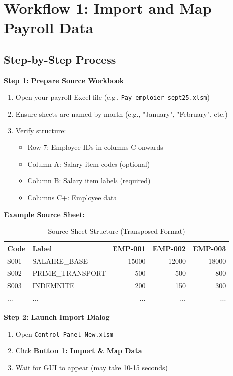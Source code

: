 \section{Workflow 1: Import and Map Payroll Data}

\subsection{Step-by-Step Process}

\textbf{Step 1: Prepare Source Workbook}

\begin{enumerate}
    \item Open your payroll Excel file (e.g., \texttt{Pay\_emploier\_sept25.xlsm})
    \item Ensure sheets are named by month (e.g., "January", "February", etc.)
    \item Verify structure:
    \begin{itemize}
        \item Row 7: Employee IDs in columns C onwards
        \item Column A: Salary item codes (optional)
        \item Column B: Salary item labels (required)
        \item Columns C+: Employee data
    \end{itemize}
\end{enumerate}

\textbf{Example Source Sheet:}

\begin{table}[H]
\centering
\footnotesize
\begin{tabular}{|l|l|r|r|r|}
\hline
\textbf{Code} & \textbf{Label} & \textbf{EMP-001} & \textbf{EMP-002} & \textbf{EMP-003} \\
\hline
S001 & SALAIRE\_BASE & 15000 & 12000 & 18000 \\
S002 & PRIME\_TRANSPORT & 500 & 500 & 800 \\
S003 & INDEMNITE & 200 & 150 & 300 \\
... & ... & ... & ... & ... \\
\hline
\end{tabular}
\caption{Source Sheet Structure (Transposed Format)}
\end{table}

\textbf{Step 2: Launch Import Dialog}

\begin{enumerate}
    \item Open \texttt{Control\_Panel\_New.xlsm}
    \item Click \textbf{Button 1: Import \& Map Data}
    \item Wait for GUI to appear (may take 10-15 seconds)
\end{enumerate}

